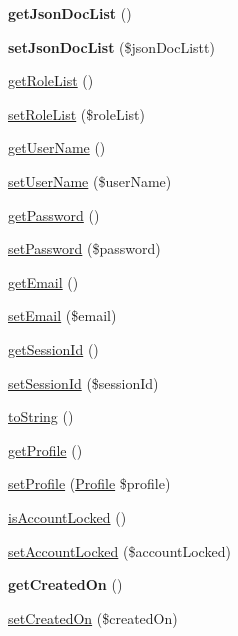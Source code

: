 \begin{DoxyCompactItemize}
\item 
\hypertarget{class_user_a6900743273016ed1df50e4bd583e504d}{{\bfseries get\+Json\+Doc\+List} ()}\label{class_user_a6900743273016ed1df50e4bd583e504d}

\item 
\hypertarget{class_user_aef4a433397f853b137db6583437b4d6e}{{\bfseries set\+Json\+Doc\+List} (\$json\+Doc\+Listt)}\label{class_user_aef4a433397f853b137db6583437b4d6e}

\item 
\hyperlink{class_user_a3589ce7d5e9671ab9a593abdbac80818}{get\+Role\+List} ()
\item 
\hyperlink{class_user_afed3edbfb265c13ab2c6dc4b9ddfd52d}{set\+Role\+List} (\$role\+List)
\item 
\hyperlink{class_user_aafd6d1ef27e6acc5833aba4012e5ee77}{get\+User\+Name} ()
\item 
\hyperlink{class_user_a20f0087f72763b84d2992ba6ffee2fb2}{set\+User\+Name} (\$user\+Name)
\item 
\hyperlink{class_user_a04e0957baeb7acde9c0c86556da2d43f}{get\+Password} ()
\item 
\hyperlink{class_user_a3e35c8d3dbb2c513c618a664389e0926}{set\+Password} (\$password)
\item 
\hyperlink{class_user_a02a01849f28e2535e888ae4ec87b20f2}{get\+Email} ()
\item 
\hyperlink{class_user_a5ef76eef42d2624386442eeb636d338c}{set\+Email} (\$email)
\item 
\hyperlink{class_user_aa9889007e27fedadb28ae8f2fd77a569}{get\+Session\+Id} ()
\item 
\hyperlink{class_user_ace8bf79f08c5588b7b15f2fc69386560}{set\+Session\+Id} (\$session\+Id)
\item 
\hyperlink{class_user_a5558c5d549f41597377fa1ea8a1cefa3}{to\+String} ()
\item 
\hyperlink{class_user_abfc25ec9545bfee35877db62d8f87401}{get\+Profile} ()
\item 
\hyperlink{class_user_afae18a30351301052e2b898637df97a3}{set\+Profile} (\hyperlink{class_profile}{Profile} \$profile)
\item 
\hyperlink{class_user_aee3b0ce22d0f9466956a6b15a483f7fa}{is\+Account\+Locked} ()
\item 
\hyperlink{class_user_a1932aea6337906c5bf48df1b2d4e9d9d}{set\+Account\+Locked} (\$account\+Locked)
\item 
\hypertarget{class_user_a346b90b05b25684ab3d2c62566270551}{{\bfseries get\+Created\+On} ()}\label{class_user_a346b90b05b25684ab3d2c62566270551}

\item 
\hyperlink{class_user_adff89ef96f7c1e0f0752caca8ccc750b}{set\+Created\+On} (\$created\+On)
\end{DoxyCompactItemize}
